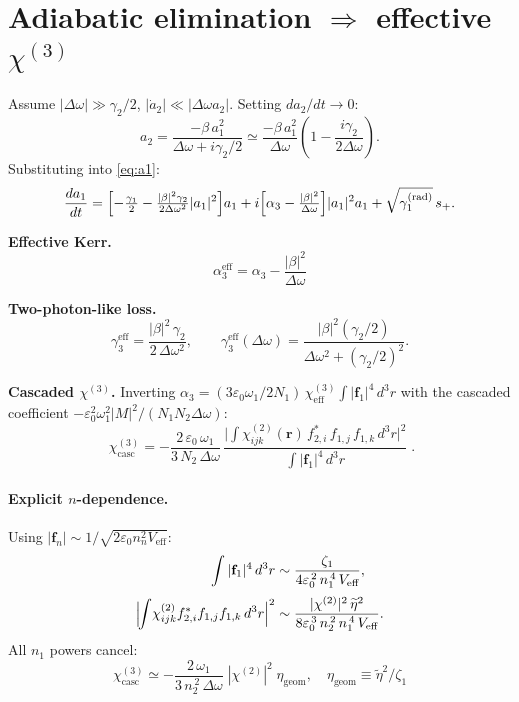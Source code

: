 \documentclass[11pt,a4paper]{article}
\newcommand{\eps}{\varepsilon}
\newcommand{\bvec}[1]{\mathbf{#1}}
\newcommand{\f}{\bvec{f}}
\newcommand{\ri}{\bvec{r}}
\newcommand{\dthreer}{\,d^{3}r}
\newcommand{\chitwo}{\chi^{(2)}}
\newcommand{\chithree}{\chi^{(3)}}
\newcommand{\Dom}{\Delta\omega}
\begin{document}
\section{Adiabatic elimination $\Rightarrow$ effective $\chithree$}\label{sec:adiab}

Assume $|\Dom|\gg\gamma_2/2$, $|\dot a_2|\ll|\Dom a_2|$. Setting $da_2/dt\to 0$:
\begin{equation}
  a_2=\frac{-\beta\,a_1^2}{\Dom+i\gamma_2/2}
     \simeq\frac{-\beta\,a_1^2}{\Dom}\!\left(1-\frac{i\gamma_2}{2\Dom}\right).
\end{equation}
Substituting into \eqref{eq:a1}:
\begin{equation}
  \frac{da_1}{dt}=
   \Bigl[-\tfrac{\gamma_1}{2}-\tfrac{|\beta|^2\gamma_2}{2\Dom^{2}}|a_1|^2\Bigr]a_1
   +i\Bigl[\alpha_3-\tfrac{|\beta|^2}{\Dom}\Bigr]|a_1|^2 a_1
   +\sqrt{\gamma_1^{(\text{rad})}}\,s_+ .
\end{equation}

\textbf{Effective Kerr.}
\begin{equation}
  \boxed{\;\alpha_3^{\text{eff}}=\alpha_3-\frac{|\beta|^2}{\Dom}\;}
\end{equation}

\textbf{Two-photon-like loss.}
\begin{equation}
  \gamma_3^\text{eff}=\frac{|\beta|^{2}\,\gamma_2}{2\,\Dom^{2}},
  \qquad
  \gamma_3^\text{eff}(\Dom)=\frac{|\beta|^{2}(\gamma_2/2)}{\Dom^{2}+(\gamma_2/2)^{2}}.
  \label{eq:gamma3-adiab}
\end{equation}

\textbf{Cascaded $\chithree$.} Inverting $\alpha_3=(3\eps_0\omega_1/2N_1)\,\chithree_\text{eff}\!\int|\f_1|^4\dthreer$
with the cascaded coefficient $-\eps_0^2\omega_1^2|M|^2/(N_1N_2\Dom)$:
\begin{equation}
  \boxed{\;\chithree_{\text{casc}}=-\frac{2\,\eps_0\,\omega_1}{3\,N_2\,\Dom}\,
       \frac{\bigl|\!\int\!\chitwo_{ijk}(\ri)\,f_{2,i}^*\,f_{1,j}\,f_{1,k}\dthreer\bigr|^{2}}
            {\int|\f_1|^4\dthreer}\;.}
\label{eq:chi3casc}
\end{equation}

\paragraph{Explicit $n$-dependence.} Using $|\f_n|\sim 1/\sqrt{2\eps_0 n_n^2 V_\text{eff}}$:
\begin{align}
  \int|\f_1|^4\dthreer&\sim\frac{\zeta_1}{4\eps_0^{\,2}\,n_1^{\,4}\,V_\text{eff}},
  \\[2pt]
  \Bigl|\!\int\!\chitwo_{ijk}f_{2,i}^*f_{1,j}f_{1,k}\dthreer\Bigr|^{2}
        &\sim\frac{|\chitwo|^{2}\,\widetilde\eta^{2}}{8\eps_0^{\,3}\,n_2^{\,2}\,n_1^{\,4}\,V_\text{eff}}.
\end{align}
All $n_1$ powers cancel:
\begin{equation}
  \boxed{\;\chithree_{\text{casc}}\simeq-\frac{2\,\omega_1}{3\,n_2^{\,2}\,\Dom}\;|\chitwo|^{2}\;\eta_\text{geom},
        \quad \eta_\text{geom}\equiv\widetilde\eta^{2}/\zeta_1\;}
\label{eq:chi3casc_explicit}
\end{equation}
\end{document}
